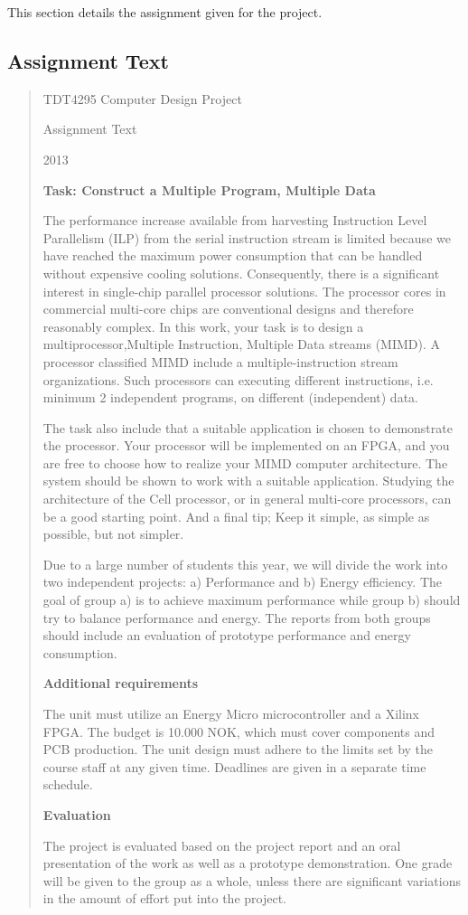 
This section details the assignment given for the project.

\subsection{Assignment Text}
\label{subsection:assignment-text}

\begin{quote}

\begin{center}
TDT4295 Computer Design Project

Assignment Text

2013 
\end{center}
 
\textbf{Task: Construct a Multiple Program, Multiple Data}

The performance increase available from harvesting Instruction Level Parallelism (ILP) from the serial instruction stream is limited because we have reached the maximum power consumption that can be handled without expensive cooling solutions.
Consequently, there is a significant interest in single-chip parallel processor solutions.
The processor cores in commercial multi-core chips are conventional designs and therefore reasonably complex.
In this work, your task is to design a multiprocessor,Multiple Instruction, Multiple Data streams (MIMD).
A processor classified MIMD include a multiple-instruction stream organizations.
Such processors can executing different instructions, i.e. minimum 2 independent programs, on different (independent) data.

The task also include that a suitable application is chosen to demonstrate the processor.
Your processor will be implemented on an FPGA, and you are free to choose how to realize your MIMD computer architecture.
The system should be shown to work with a suitable application.
Studying the architecture of the Cell processor, or in general multi-core processors, can be a good starting point.
And a final tip; Keep it simple, as simple as possible, but not simpler.

Due to a large number of students this year, we will divide the work into two independent projects: a) Performance and b) Energy efficiency.
The goal of group a) is to achieve maximum performance while group b) should try to balance performance and energy.
The reports from both groups should include an evaluation of prototype performance and energy consumption.

\textbf{Additional requirements}

The unit must utilize an Energy Micro microcontroller and a Xilinx FPGA.
The budget is 10.000 NOK, which must cover components and PCB production.
The unit design must adhere to the limits set by the course staff at any given time.
Deadlines are given in a separate time schedule.

\textbf{Evaluation}

The project is evaluated based on the project report and an oral presentation of the work as well as a prototype demonstration.
One grade will be given to the group as a whole, unless there are significant variations in the amount of effort put into the project. 
\cite{assignment-text}
\end{quote}

